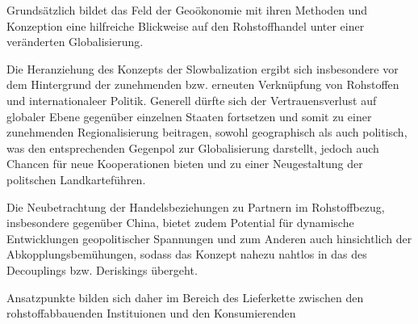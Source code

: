 \documentclass[12pt,a4paper,oneside]{book} %
\begin{document}
{	Grundsätzlich bildet das Feld der Geoökonomie mit ihren Methoden und Konzeption eine hilfreiche Blickweise auf den Rohstoffhandel unter einer veränderten Globalisierung.
	
	Die Heranziehung des Konzepts der Slowbalization ergibt sich insbesondere vor dem Hintergrund der zunehmenden bzw. erneuten Verknüpfung von Rohstoffen und internationaleer Politik. Generell dürfte sich der Vertrauensverlust auf globaler Ebene gegenüber einzelnen Staaten fortsetzen und somit zu einer zunehmenden Regionalisierung beitragen, sowohl geographisch als auch politisch, was den entsprechenden Gegenpol zur Globalisierung darstellt, jedoch auch Chancen für neue Kooperationen bieten und zu einer \glqq Neugestaltung der politschen Landkarte\grqq führen.\autocite{UI Report, The politics of critical raw materials, S. 4-5}
	
	Die Neubetrachtung der Handelsbeziehungen zu Partnern im Rohstoffbezug, insbesondere gegenüber China, bietet zudem Potential für dynamische Entwicklungen geopolitischer Spannungen und zum Anderen auch hinsichtlich der Abkopplungsbemühungen, sodass das Konzept nahezu nahtlos in das des Decouplings bzw. Deriskings übergeht. 
	
	Ansatzpunkte bilden sich daher im Bereich des Lieferkette zwischen den rohstoffabbauenden Instituionen und den Konsumierenden
	
	
}
\end{document}
